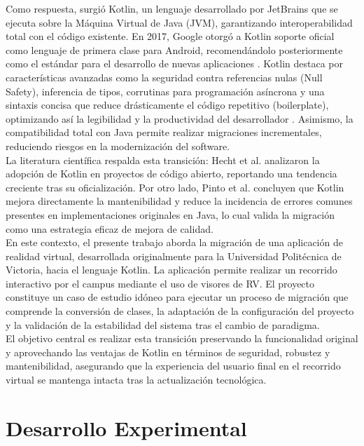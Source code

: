\documentclass[conference]{IEEEtran}
\begin{document}
Como respuesta, surgió Kotlin, un lenguaje desarrollado por JetBrains que se ejecuta sobre la Máquina Virtual de Java (JVM), garantizando interoperabilidad total con el código existente. En 2017, Google otorgó a Kotlin soporte oficial como lenguaje de primera clase para Android, recomendándolo posteriormente como el estándar para el desarrollo de nuevas aplicaciones \cite{kotlinandroid, jetbrains}. Kotlin destaca por características avanzadas como la seguridad contra referencias nulas (Null Safety), inferencia de tipos, corrutinas para programación asíncrona y una sintaxis concisa que reduce drásticamente el código repetitivo (boilerplate), optimizando así la legibilidad y la productividad del desarrollador \cite{kotlindocs}. Asimismo, la compatibilidad total con Java permite realizar migraciones incrementales, reduciendo riesgos en la modernización del software.\\

La literatura científica respalda esta transición: Hecht et al. \cite{hecht2019} analizaron la adopción de Kotlin en proyectos de código abierto, reportando una tendencia creciente tras su oficialización. Por otro lado, Pinto et al. \cite{pinto2021} concluyen que Kotlin mejora directamente la mantenibilidad y reduce la incidencia de errores comunes presentes en implementaciones originales en Java, lo cual valida la migración como una estrategia eficaz de mejora de calidad.\\

En este contexto, el presente trabajo aborda la migración de una aplicación de realidad virtual, desarrollada originalmente para la Universidad Politécnica de Victoria, hacia el lenguaje Kotlin. La aplicación permite realizar un recorrido interactivo por el campus mediante el uso de visores de RV. El proyecto constituye un caso de estudio idóneo para ejecutar un proceso de migración que comprende la conversión de clases, la adaptación de la configuración del proyecto y la validación de la estabilidad del sistema tras el cambio de paradigma.\\

El objetivo central es realizar esta transición preservando la funcionalidad original y aprovechando las ventajas de Kotlin en términos de seguridad, robustez y mantenibilidad, asegurando que la experiencia del usuario final en el recorrido virtual se mantenga intacta tras la actualización tecnológica.\\

\section{Desarrollo Experimental}
\end{document}
